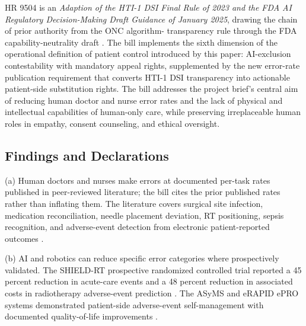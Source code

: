 
HR 9504 is an \textit{Adaption of the HTI-1 DSI Final Rule of 2023
and the FDA AI Regulatory Decision-Making Draft Guidance of January
2025}, drawing the chain of prior authority from the ONC algorithm-
transparency rule through the FDA capability-neutrality draft
\cite{rank9_onc_hti1_2023, hti1_dsi_fact_sheet_2023,
fda_ai_regulatory_decision_draft_2025}. The bill implements the
sixth dimension of the operational definition of patient control
introduced by this paper: AI-exclusion contestability with mandatory
appeal rights, supplemented by the new error-rate publication
requirement that converts HTI-1 DSI transparency into actionable
patient-side substitution rights. The bill addresses the project
brief's central aim of reducing human doctor and nurse error rates
and the lack of physical and intellectual capabilities of human-only
care, while preserving irreplaceable human roles in empathy, consent
counseling, and ethical oversight.

\subsection{Findings and Declarations}

(a) Human doctors and nurses make errors at documented per-task
rates published in peer-reviewed literature; the bill cites the
prior published rates rather than inflating them. The literature
covers surgical site infection, medication reconciliation, needle
placement deviation, RT positioning, sepsis recognition, and
adverse-event detection from electronic patient-reported outcomes
\cite{rocque2025remote_symptom_monitoring}.

(b) AI and robotics can reduce specific error categories where
prospectively validated. The SHIELD-RT prospective randomized
controlled trial reported a 45 percent reduction in acute-care events
and a 48 percent reduction in associated costs in radiotherapy
adverse-event prediction
\cite{rocque2025remote_symptom_monitoring}. The ASyMS and eRAPID
ePRO systems demonstrated patient-side adverse-event self-management
with documented quality-of-life improvements
\cite{kearney2009asyms, maguire2017esmart, absolom2021erapid}.

